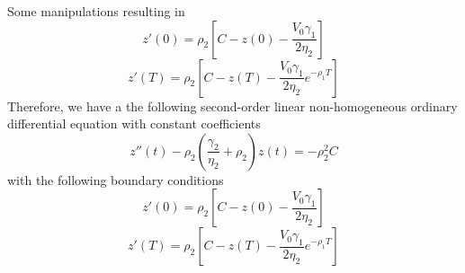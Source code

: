 \documentclass{article}
\begin{document}
Some manipulations resulting in
\[
  z'(0) = \rho_2 \left[C - z(0) - \frac{V_0 \gamma_1}{2 \eta_2} \right]
\]
\[
  z'(T) = \rho_2 \left[C - z(T) - \frac{V_0 \gamma_1}{2 \eta_2} e^{-\rho_1 T}\right]
\]
Therefore, we have a the following second-order linear non-homogeneous ordinary differential equation with constant coefficients
\begin{equation}\label{ode_for_all_cond}
  z{''}(t)  - \rho_2\left(\frac{\gamma_2}{\eta_2} + \rho_2 \right) z(t) = -\rho_2^2 C
\end{equation}
with the following boundary conditions
\begin{equation}\label{ode_boundary_cond_1}
  z'(0) = \rho_2 \left[C - z(0) - \frac{V_0 \gamma_1}{2 \eta_2} \right]
\end{equation}
\begin{equation}\label{ode_boundary_cond_2}
  z'(T) = \rho_2 \left[C - z(T) - \frac{V_0 \gamma_1}{2 \eta_2} e^{-\rho_1 T}\right]
\end{equation}
\end{document}
